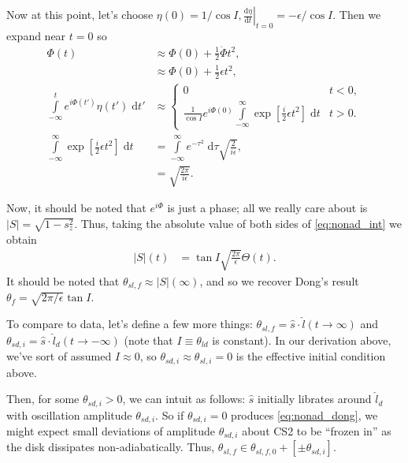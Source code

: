 \documentclass[11pt,
        usenames, %
        dvipsnames %
    ]{article}
\newcommand*{\rd}[2]{\frac{\mathrm{d}#1}{\mathrm{d}#2}}
\newcommand*{\at}[1]{\left.#1\right|}
\newcommand*{\abs}[1]{\left|#1\right|}
\newcommand*{\s}[1]{\left[#1\right]}
\begin{document}
Now at this point, let's choose $\eta(0) = 1/\cos I, \at{\rd{\eta}{t}}_{t=0} =
-\epsilon/\cos I$. Then we expand near $t = 0$ so
\begin{align*}
    \Phi(t) &\approx \Phi(0) + \frac{1}{2}\ddot{\Phi}t^2,\\
        &\approx \Phi(0) + \frac{1}{2}\epsilon t^2,\\
    \int\limits_{-\infty}^t e^{i\Phi(t')}\eta(t')\;\mathrm{d}t'
        &\approx
        \begin{cases}
            0 & t < 0,\\
            \frac{1}{\cos I}e^{i\Phi(0)}\int\limits_{-\infty}^\infty
                \exp\s{\frac{i}{2}\epsilon t^2}\;\mathrm{d}t
                & t > 0.
        \end{cases}\\
    \int\limits_{-\infty}^\infty
                \exp\s{\frac{i}{2}\epsilon t^2}\;\mathrm{d}t
        &= \int\limits_{-\infty}^\infty e^{-\tau^2}\;\mathrm{d}\tau
            \sqrt{\frac{2}{i\epsilon}},\\
        &= \sqrt{\frac{2\pi}{i\epsilon}}.
\end{align*}

Now, it should be noted that $e^{i\Phi}$ is just a phase; all we really care
about is $\abs{S} = \sqrt{1 - s_z^2}$. Thus, taking the absolute value of both
sides of \autoref{eq:nonad_int} we obtain
\begin{align}
    \abs{S}(t) &= \tan I\sqrt{\frac{2\pi}{\epsilon}}\Theta(t).
        \label{eq:nonad_dong}
\end{align}
It should be noted that $\theta_{sl, f} \approx \abs{S}(\infty)$, and so we
recover Dong's result $\theta_f = \sqrt{2\pi/\epsilon}\tan I$.

To compare to data, let's define a few more things: $\theta_{sl, f} = \hat{s}
\cdot \hat{l}(t \to \infty)$ and $\theta_{sd, i} = \hat{s} \cdot \hat{l}_d(t \to
-\infty)$ (note that $I \equiv \theta_{ld}$ is constant). In our derivation
above, we've sort of assumed $I \approx 0$, so $\theta_{sd, i} \approx
\theta_{sl, i} = 0$ is the effective initial condition above.

Then, for some $\theta_{sd, i} > 0$, we can intuit as follows: $\hat{s}$
initially librates around $\hat{l}_d$ with oscillation amplitude $\theta_{sd,
i}$. So if $\theta_{sd, i} = 0$ produces \autoref{eq:nonad_dong}, we might
expect small deviations of amplitude $\theta_{sd, i}$ about CS2 to be ``frozen
in'' as the disk dissipates non-adiabatically. Thus, $\theta_{sl, f} \in
\theta_{sl, f, 0} + \s{\pm \theta_{sd, i}}$.
\end{document}
